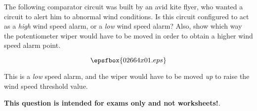 

The following comparator circuit was built by an avid kite flyer, who wanted a circuit to alert him to abnormal wind conditions.  Is this circuit configured to act as a {\it high} wind speed alarm, or a {\it low} wind speed alarm?  Also, show which way the potentiometer wiper would have to be moved in order to obtain a higher wind speed alarm point.

$$\epsfbox{02664x01.eps}$$







This is a {\it low} speed alarm, and the wiper would have to be moved {\it up} to raise the wind speed threshold value.







{\bf This question is intended for exams only and not worksheets!}.




